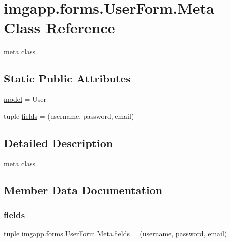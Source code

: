 \hypertarget{classimgapp_1_1forms_1_1UserForm_1_1Meta}{}\section{imgapp.\+forms.\+User\+Form.\+Meta Class Reference}
\label{classimgapp_1_1forms_1_1UserForm_1_1Meta}


meta class  


\subsection*{Static Public Attributes}
\begin{DoxyCompactItemize}
\item 
\hyperlink{classimgapp_1_1forms_1_1UserForm_1_1Meta_ae646e248a6bf9567c583461a2df4a836}{model} = User
\item 
tuple \hyperlink{classimgapp_1_1forms_1_1UserForm_1_1Meta_a3db99dc49ab4b8ad78e26cf780b6d276}{fields} = (\textquotesingle{}username\textquotesingle{}, \textquotesingle{}password\textquotesingle{}, \textquotesingle{}email\textquotesingle{})
\end{DoxyCompactItemize}


\subsection{Detailed Description}
meta class 

\subsection{Member Data Documentation}
\mbox{\label{classimgapp_1_1forms_1_1UserForm_1_1Meta_a3db99dc49ab4b8ad78e26cf780b6d276}} 
\subsubsection{\texorpdfstring{fields}{fields}}
{\footnotesize\ttfamily tuple imgapp.\+forms.\+User\+Form.\+Meta.\+fields = (\textquotesingle{}username\textquotesingle{}, \textquotesingle{}password\textquotesingle{}, \textquotesingle{}email\textquotesingle{})\hspace{0.3cm}{\ttfamily [static]}}

